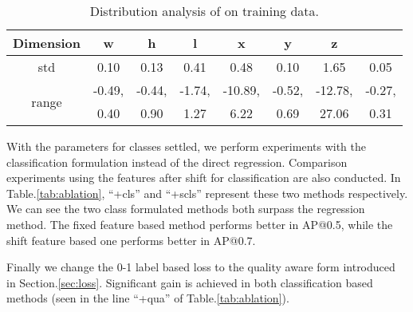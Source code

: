 \documentclass[10pt,twocolumn,letterpaper]{article}
\begin{document}
\begin{table}[!ht]
\setlength{\tabcolsep}{1mm}
\footnotesize
\begin{center}
\begin{tabular}{| c | c | c | c | c | c | c | c |}
\hline
Dimension & w & h & l & x & y & z &  \\
\hline
std & 0.10 & 0.13 & 0.41 & 0.48 & 0.10 & 1.65 & 0.05 \\
\hline
\multirow{2}{*}{range} & -0.49,  & -0.44,  & -1.74,  & -10.89,  & -0.52,  & -12.78,  & -0.27,  \\
&0.40 & 0.90 & 1.27 & 6.22 & 0.69 & 27.06 & 0.31 \\
\hline
\end{tabular}
\vspace{1mm}
\caption{Distribution analysis of  on training data.}
\label{tab:std}
\end{center}
\end{table}

With the parameters for classes settled, we perform experiments with the classification formulation instead of the direct regression. Comparison experiments using the features after shift for classification are also conducted. In Table.\ref{tab:ablation}, ``+cls'' and ``+scls'' represent these two methods respectively. We can see the two class formulated methods both surpass the regression method. The fixed feature based method performs better in AP@0.5, while the shift feature based one performs better in AP@0.7. 

Finally we change the 0-1 label based loss to the quality aware form introduced in Section.\ref{sec:loss}. Significant gain is achieved in both classification based methods (seen in the line ``+qua'' of Table.\ref{tab:ablation}).
\end{document}
